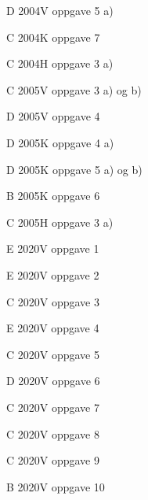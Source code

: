 \documentclass[a4paper,norsk,11pt]{interaktiv}
\begin{document}
\begin{oppgave}{D}
2004V oppgave 5 a)
\end{oppgave}

\begin{oppgave}{C}
2004K oppgave 7
\end{oppgave}

\begin{oppgave}{C}
2004H oppgave 3 a)
\end{oppgave}

\begin{oppgave}{C}
2005V oppgave 3 a) og b)
\end{oppgave}

\begin{oppgave}{D}
2005V oppgave 4
\end{oppgave}

\begin{oppgave}{D}
2005K oppgave 4 a)
\end{oppgave}

\begin{oppgave}{D}
2005K oppgave 5 a) og b)
\end{oppgave}

\begin{oppgave}{B}
2005K oppgave 6
\end{oppgave}

\begin{oppgave}{C}
2005H oppgave 3 a)
\end{oppgave}


\begin{oppgave}{E}
2020V oppgave 1 
\end{oppgave}
\begin{oppgave}{E}
2020V oppgave  2
\end{oppgave}
\begin{oppgave}{C}
2020V oppgave  3
\end{oppgave}
\begin{oppgave}{E}
2020V oppgave  4
\end{oppgave}
\begin{oppgave}{C}
2020V oppgave  5
\end{oppgave}
\begin{oppgave}{D}
2020V oppgave  6
\end{oppgave}
\begin{oppgave}{C}
2020V oppgave  7
\end{oppgave}
\begin{oppgave}{C}
2020V oppgave  8
\end{oppgave}
\begin{oppgave}{C}
2020V oppgave  9
\end{oppgave}
\begin{oppgave}{B}
2020V oppgave  10
\end{oppgave}



\end{document}
